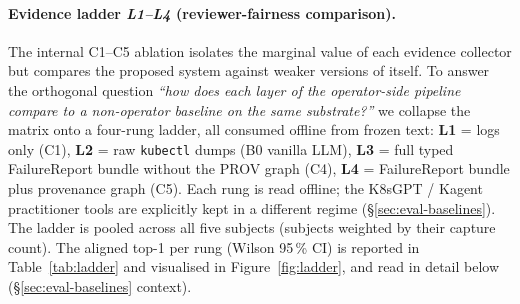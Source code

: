 \documentclass[sigconf, nonacm=true, anonymous=false, review=false]{acmart}
\newcommand{\fp}{FailureReport\xspace}
\newcommand{\Cn}[1]{C#1\xspace}
\begin{document}
\paragraph{Evidence ladder \emph{L1--L4} (reviewer-fairness comparison).}
The internal \Cn{1}--\Cn{5} ablation isolates the marginal value of
each evidence collector but compares the proposed system against
weaker versions of itself. To answer the orthogonal question
\emph{``how does each layer of the operator-side pipeline compare
to a non-operator baseline on the same substrate?''} we collapse the
matrix onto a four-rung ladder, all consumed offline from frozen
text:
\textbf{L1} = logs only (\Cn{1}), \textbf{L2} = raw \texttt{kubectl}
dumps (B0 vanilla LLM), \textbf{L3} = full typed \fp{} bundle without
the PROV graph (\Cn{4}), \textbf{L4} = \fp{} bundle plus provenance
graph (\Cn{5}). Each rung is read offline; the K8sGPT / Kagent
practitioner tools are explicitly kept in a different regime
(\S\ref{sec:eval-baselines}). The ladder is pooled across all five
subjects (subjects weighted by their capture count). The aligned
top-1 per rung (Wilson 95\,\% CI) is reported in
Table~\ref{tab:ladder} and visualised in Figure~\ref{fig:ladder}, and
read in detail below (\S\ref{sec:eval-baselines} context).
\end{document}
